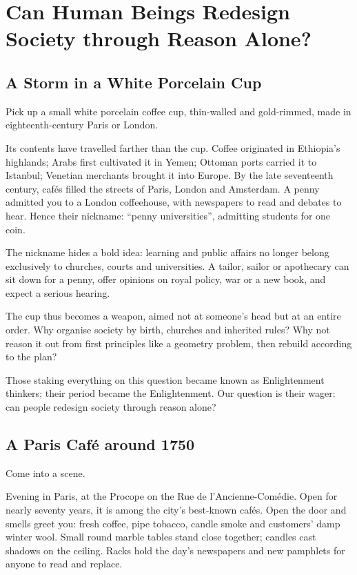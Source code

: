 \chapter[Can Reason Redesign Society?]{Can Human Beings Redesign Society through Reason Alone?}
\section{A Storm in a White Porcelain Cup}
Pick up a small white porcelain coffee cup, thin-walled and gold-rimmed, made in eighteenth-century Paris or London.

Its contents have travelled farther than the cup. Coffee originated in Ethiopia's highlands; Arabs first cultivated it in Yemen; Ottoman ports carried it to Istanbul; Venetian merchants brought it into Europe. By the late seventeenth century, cafés filled the streets of Paris, London and Amsterdam. A penny admitted you to a London coffeehouse, with newspapers to read and debates to hear. Hence their nickname: ``penny universities'', admitting students for one coin.

The nickname hides a bold idea: learning and public affairs no longer belong exclusively to churches, courts and universities. A tailor, sailor or apothecary can sit down for a penny, offer opinions on royal policy, war or a new book, and expect a serious hearing.

The cup thus becomes a weapon, aimed not at someone's head but at an entire order. Why organise society by birth, churches and inherited rules? Why not reason it out from first principles like a geometry problem, then rebuild according to the plan?

Those staking everything on this question became known as Enlightenment thinkers; their period became the Enlightenment. Our question is their wager: can people redesign society through reason alone?

\section{A Paris Café around 1750}
Come into a scene.

Evening in Paris, at the Procope on the Rue de l'Ancienne-Comédie. Open for nearly seventy years, it is among the city's best-known cafés. Open the door and smells greet you: fresh coffee, pipe tobacco, candle smoke and customers' damp winter wool. Small round marble tables stand close together; candles cast shadows on the ceiling. Racks hold the day's newspapers and new pamphlets for anyone to read and replace.


